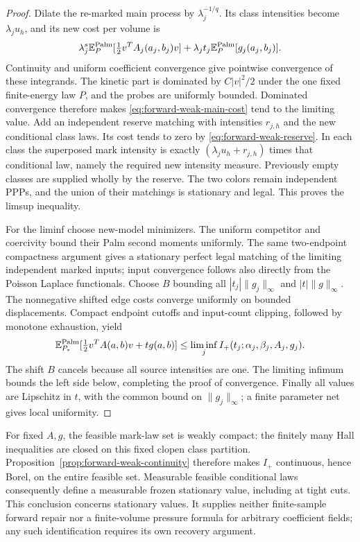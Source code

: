 \documentclass[11pt,reqno]{amsart}
\theoremstyle{definition}
\theoremstyle{remark}
\numberwithin{equation}{section}
\newcommand{\E}{\mathbb E}
\begin{document}
\begin{proof}
Dilate the re-marked main process by \(\lambda_j^{-1/q}\).
Its class intensities become \(\lambda_j u_h\), and its new cost
per volume is
\begin{equation}
\label{eq:forward-weak-main-cost}
 \lambda_j^s\E_P^{\rm Palm}
       [\tfrac12 v^TA_j(a_j,b_j)v]
       +\lambda_j t_j\E_P^{\rm Palm}[g_j(a_j,b_j)].
\end{equation}
Continuity and uniform coefficient convergence give pointwise
convergence of these integrands. The kinetic part is dominated by
\(C|v|^2/2\) under the one fixed finite-energy law \(P\), and
the probes are uniformly bounded. Dominated convergence therefore
makes \eqref{eq:forward-weak-main-cost} tend to the limiting value.
Add an independent reserve matching with intensities \(r_{j,h}\)
and the new conditional class laws. Its cost tends to zero by
\eqref{eq:forward-weak-reserve}. In each class the superposed mark
intensity is exactly \((\lambda_j u_h+r_{j,h})\) times that
conditional law, namely the required new intensity measure.
Previously empty classes are supplied wholly by the reserve.
The two colors remain independent PPPs, and the union of their
matchings is stationary and legal. This proves the limsup inequality.

For the liminf choose new-model minimizers. The uniform competitor
and coercivity bound their Palm second moments uniformly. The same
two-endpoint compactness argument gives a stationary perfect legal
matching of the limiting independent marked inputs; input convergence
follows also directly from the Poisson Laplace functionals.
Choose \(B\) bounding all \(|t_j|\|g_j\|_\infty\) and
\(|t|\|g\|_\infty\). The nonnegative shifted edge costs converge
uniformly on bounded displacements. Compact endpoint cutoffs and
input-count clipping, followed by monotone exhaustion, yield
\[
 \E_{P_*}^{\rm Palm}[\tfrac12v^TA(a,b)v+t g(a,b)]
       \le\liminf_j I_+(t_j;\alpha_j,\beta_j,A_j,g_j).
\]
The shift \(B\) cancels because all source intensities are one.
The limiting infimum bounds the left side below, completing the proof
of convergence. Finally all values are Lipschitz in \(t\), with
the common bound on \(\|g_j\|_\infty\); a finite parameter net
gives local uniformity.
\end{proof}

For fixed \(A,g\), the feasible mark-law set is weakly compact:
the finitely many Hall inequalities are closed on this fixed clopen
class partition. Proposition~\ref{prop:forward-weak-continuity}
therefore makes \(I_+\) continuous, hence Borel, on the entire feasible
set. Measurable feasible conditional laws consequently define a
measurable frozen stationary value, including at tight cuts.
This conclusion concerns stationary values. It supplies neither
finite-sample forward repair nor a finite-volume pressure formula for
arbitrary coefficient fields; any such identification requires its
own recovery argument.
\end{document}
